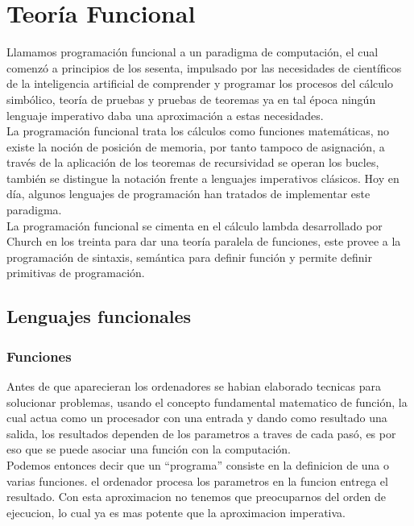 
\chapter{Teoría Funcional}

Llamamos programación funcional a un paradigma de computación, el cual comenzó a principios de los sesenta, impulsado por las necesidades de científicos de la inteligencia artificial de comprender y programar los procesos del cálculo simbólico, teoría de pruebas y pruebas de teoremas ya en tal época ningún lenguaje imperativo daba una aproximación a estas necesidades.\\
La programación funcional trata los cálculos como funciones matemáticas, no existe la noción de posición de memoria, por tanto tampoco de asignación, a través de la aplicación de los teoremas de recursividad se operan los bucles, también se distingue la notación frente a lenguajes imperativos clásicos. Hoy en día, algunos lenguajes de programación han tratados de implementar este paradigma.\\
La programación funcional se cimenta en el cálculo lambda desarrollado por Church en los treinta para dar una teoría paralela de funciones, este provee a la programación de sintaxis, semántica para definir función y permite definir primitivas de programación.

\section{Lenguajes funcionales}

\subsection{Funciones}

Antes de que aparecieran los ordenadores se habian elaborado tecnicas para solucionar problemas,  usando el concepto fundamental matematico de función, la cual actua como un procesador con una entrada y dando como resultado una salida, los resultados dependen de los parametros a traves de cada pasó, es por eso que se puede asociar una función con la computación.\\

Podemos entonces decir que un ``programa'' consiste en la definicion de una o varias funciones.  el ordenador procesa los parametros en la funcion  entrega el resultado. Con esta aproximacion no tenemos que preocuparnos del orden de ejecucion, lo cual ya es mas potente que la aproximacion imperativa.

